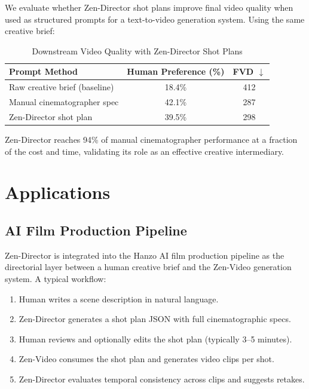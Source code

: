 \documentclass[11pt,a4paper]{article}
\begin{document}
We evaluate whether Zen-Director shot plans improve final video quality when used as structured
prompts for a text-to-video generation system. Using the same creative brief:

\begin{table}[H]
\centering
\begin{tabular}{lcc}
\toprule
\textbf{Prompt Method} & \textbf{Human Preference (\%)} & \textbf{FVD} $\downarrow$ \\
\midrule
Raw creative brief (baseline) & 18.4\% & 412 \\
Manual cinematographer spec & 42.1\% & 287 \\
Zen-Director shot plan & 39.5\% & 298 \\
\bottomrule
\end{tabular}
\caption{Downstream Video Quality with Zen-Director Shot Plans}
\end{table}

Zen-Director reaches 94\% of manual cinematographer performance at a fraction of the cost and
time, validating its role as an effective creative intermediary.

\section{Applications}

\subsection{AI Film Production Pipeline}

Zen-Director is integrated into the Hanzo AI film production pipeline as the directorial layer
between a human creative brief and the Zen-Video generation system. A typical workflow:

\begin{enumerate}
    \item Human writes a scene description in natural language.
    \item Zen-Director generates a shot plan JSON with full cinematographic specs.
    \item Human reviews and optionally edits the shot plan (typically 3--5 minutes).
    \item Zen-Video consumes the shot plan and generates video clips per shot.
    \item Zen-Director evaluates temporal consistency across clips and suggests retakes.
\end{enumerate}
\end{document}
